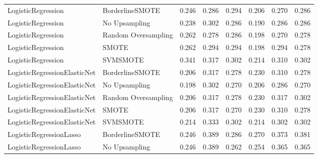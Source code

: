 \begin{tabular}{llllllll}
          LogisticRegression &     BorderlineSMOTE & 0.246 &                     0.286 &                 0.294 &                  0.206 &                                   0.270 &     0.286 \\
          LogisticRegression &       No Upsampling & 0.238 &                     0.302 &                 0.286 &                  0.190 &                                   0.286 &     0.286 \\
          LogisticRegression & Random Oversampling & 0.262 &                     0.278 &                 0.286 &                  0.198 &                                   0.270 &     0.278 \\
          LogisticRegression &               SMOTE & 0.262 &                     0.294 &                 0.294 &                  0.198 &                                   0.294 &     0.278 \\
          LogisticRegression &            SVMSMOTE & 0.341 &                     0.317 &                 0.302 &                  0.214 &                                   0.310 &     0.302 \\
LogisticRegressionElasticNet &     BorderlineSMOTE & 0.206 &                     0.317 &                 0.278 &                  0.230 &                                   0.310 &     0.278 \\
LogisticRegressionElasticNet &       No Upsampling & 0.198 &                     0.302 &                 0.270 &                  0.206 &                                   0.286 &     0.270 \\
LogisticRegressionElasticNet & Random Oversampling & 0.206 &                     0.317 &                 0.278 &                  0.230 &                                   0.317 &     0.302 \\
LogisticRegressionElasticNet &               SMOTE & 0.206 &                     0.317 &                 0.270 &                  0.230 &                                   0.310 &     0.278 \\
LogisticRegressionElasticNet &            SVMSMOTE & 0.214 &                     0.333 &                 0.302 &                  0.214 &                                   0.302 &     0.302 \\
     LogisticRegressionLasso &     BorderlineSMOTE & 0.246 &                     0.389 &                 0.286 &                  0.270 &                                   0.373 &     0.381 \\
     LogisticRegressionLasso &       No Upsampling & 0.246 &                     0.389 &                 0.262 &                  0.254 &                                   0.365 &     0.365 \\

\end{tabular}
